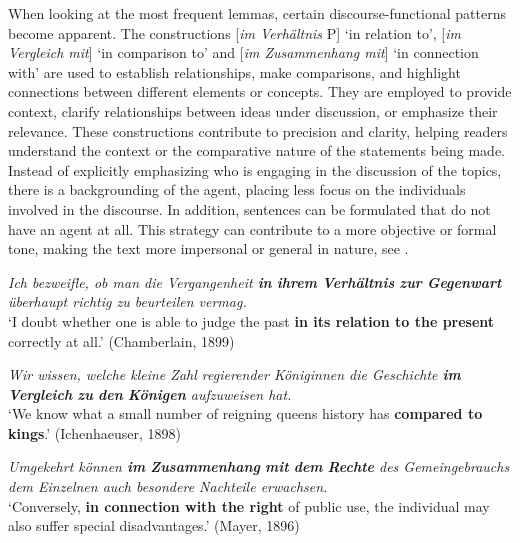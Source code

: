 \documentclass[output=paper,colorlinks,citecolor=brown]{langscibook}
\begin{document}
When looking at the most frequent lemmas, certain discourse-functional patterns become apparent. The constructions [\textit{im Verhältnis} P] ‘in relation to', [\textit{im Vergleich mit}] ‘in comparison to' and [\textit{im Zusammenhang mit}] ‘in connection with' are used to establish relationships, make comparisons, and highlight connections between different elements or concepts. They are employed to provide context, clarify relationships between ideas under discussion, or emphasize their relevance. These constructions contribute to precision and clarity, helping readers understand the context or the comparative nature of the statements being made. Instead of explicitly emphasizing who is engaging in the discussion of the topics, there is a backgrounding of the agent, placing less focus on the individuals involved in the discourse. In addition, sentences can be formulated that do not have an agent at all. This strategy can contribute to a more objective or formal tone, making the text more impersonal or general in nature, see .

\ea%
\label{ex:fleissner:6}
{\itshape Ich bezweifle, ob man die Vergangenheit \textbf{in} \textbf{ihrem} \textbf{Verhältnis} \textbf{zur} \textbf{Gegenwart} überhaupt richtig zu beurteilen vermag.}\\
\glt ‘I doubt whether one is able to judge the past \textbf{in its relation to the present }correctly at all.' \hfill (Chamberlain, 1899)
\z 

\ea%
\label{ex:fleissner:7}
{\itshape Wir wissen, welche kleine Zahl regierender Königinnen die Geschichte \textbf{im} \textbf{Vergleich} \textbf{zu} \textbf{den} \textbf{Königen} aufzuweisen hat.}\\
\glt ‘We know what a small number of reigning queens history has \textbf{compared to kings}.' \hfill (Ichenhaeuser, 1898)
\z 

\ea%
\label{ex:fleissner:8}
{\itshape Umgekehrt können \textbf{im} \textbf{Zusammenhang} \textbf{mit} \textbf{dem} \textbf{Rechte} des Gemeingebrauchs dem Einzelnen auch besondere Nachteile erwachsen.}\\
\glt ‘Conversely, \textbf{in connection with the right} of public use, the individual may also suffer special disadvantages.' \hfill (Mayer, 1896)
\z 
\end{document}
